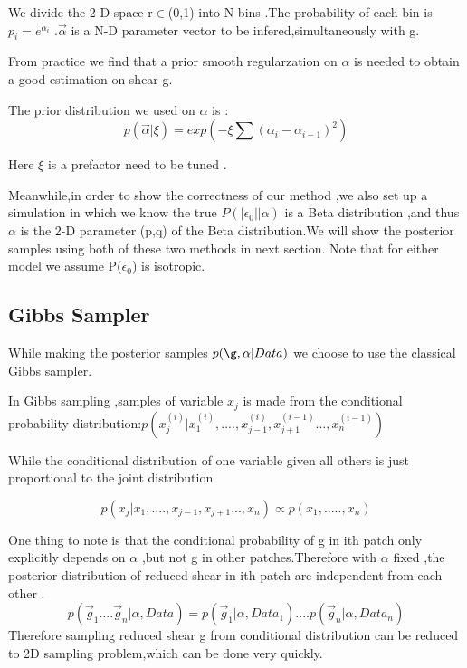 \documentclass[useAMS,usenatbib]{mn2e}
\begin{document}
We divide the 2-D space r$\in$(0,1) into N bins .The probability
of each bin is $p_{i}=e^{\alpha_{i}}$ .$\overrightarrow{\alpha}$
is a N-D parameter vector to be infered,simultaneously with g.

From practice we find that a prior smooth regularzation on $\alpha$
is needed to obtain a good estimation on shear g.

The prior distribution we used on $\alpha$ is : 
\begin{equation}
p(\vec{\alpha}|\xi)=exp(-\xi\sum(\alpha_{i}-\alpha_{i-1})^{2})
\end{equation}


Here $\xi$ is a prefactor need to be tuned .

Meanwhile,in order to show the correctness of our method ,we also
set up a simulation in which we know the true $P(|\epsilon_{0}||\alpha)$
is a Beta distribution ,and thus $\alpha$ is the 2-D parameter (p,q)
of the Beta distribution.We will show the posterior samples using
both of these two methods in next section. Note that for either model
we assume P($\epsilon_{0}$) is isotropic.


\subsection{Gibbs Sampler}

While making the posterior samples $p(\g,\alpha|Data)$ we choose to use the classical
Gibbs sampler.

In Gibbs sampling ,samples of variable $x_{j}$ is made from the conditional
probability distribution:$p(x_{j}^{(i)}|x_{1}^{(i)},....,x_{j-1}^{(i)},x_{j+1}^{(i-1)}...,x_{n}^{(i-1)})$

While the conditional distribution of one variable given all others
is just proportional to the joint distribution

\begin{equation}
p(x_{j}|x_{1},....,x_{j-1},x_{j+1}...,x_{n})\varpropto p(x_{1},.....,x_{n})
\end{equation}


One thing to note is that the conditional probability of g in ith
patch only explicitly depends on $\alpha$ ,but not g in other patches.Therefore
with $\alpha$ fixed ,the posterior distribution of reduced shear
in ith patch are independent from each other .
\begin{equation}
p(\vec{g}_{1}....\vec{g}_{n}|\alpha,Data)=p(\vec{g}_{1}|\alpha,Data_{1})....p(\vec{g}_{n}|\alpha,Data_{n})
\end{equation}
Therefore sampling reduced shear g from conditional distribution can
be reduced to 2D sampling problem,which can be done very quickly.
\end{document}
